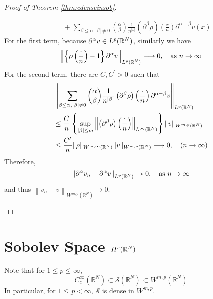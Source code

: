 \begin{proof}[Proof of Theorem \ref{thm:cdenseinsob}]
\begin{enumerate}[label=(\roman*)]
\begin{equation*}
\begin{aligned}
				& \quad+\sum_{\beta \leq \alpha,|\beta| \neq 0}\binom{\alpha}{\beta} \frac{1}{n^{|\beta|}}\left(\partial^\beta \rho\right)\left(\frac{x}{n}\right) \partial^{\alpha-\beta} v(x)
			\end{aligned}
		\end{equation*}
		For the first term, because $\partial^\alpha v \in L^p(\mathbb{R}^N)$, similarly we have
		\begin{equation*}
			\left\|\left\{\rho\left(\frac{\cdot}{n}\right)-1\right\} \partial^\alpha v\right\|_{L^p\left(\mathbb{R}^N\right)} \longrightarrow 0,\quad \text{as } n\rightarrow \infty
		\end{equation*}
		For the second term, there are $C,C^\prime > 0$ such that
		\begin{equation*}
			\begin{aligned}
				& \left\|\sum_{\beta \leq \alpha,|\beta| \neq 0}\binom{\alpha}{\beta} \frac{1}{n^{|\beta|}}\left(\partial^\beta \rho\right)\left(\frac{\cdot}{n}\right) \partial^{\alpha-\beta} v\right\|_{L^p\left(\mathbb{R}^N\right)} \\
				& \leq \frac{C}{n}\left\{\sup_{\left\lvert\beta\right\lvert\leq m}\left\|\left(\partial^\beta \rho\right)\left(\frac{\cdot}{n}\right)\right\|_{L^{\infty}\left(\mathbb{R}^N\right)}\right\}\|v\|_{W^{m, p}\left(\mathbb{R}^N\right)} \\
				& \leq \frac{C^{\prime}}{n}\|\rho\|_{W^{m, \infty}\left(\mathbb{R}^N\right)}\|v\|_{W^{m, p}\left(\mathbb{R}^N\right)} \longrightarrow 0, \quad(n \rightarrow \infty)
			\end{aligned}
		\end{equation*}
		Therefore,
		\begin{equation*}
			\left\|\partial^\alpha v_n-\partial^\alpha v\right\|_{L^p\left(\mathbb{R}^N\right)} \rightarrow 0,\quad \text{as } n\rightarrow \infty
		\end{equation*}
		and thus $\left\|v_n-v\right\|_{W^{m, p}\left(\mathbb{R}^N\right)} \rightarrow 0$.
	\end{enumerate}
\end{proof}

\section{Sobolev Space \texorpdfstring{$H^s(\mathbb{R}^N)$}{Hs}}

Note that for $1 \leq p \leq \infty$,
\begin{equation*}
	C_c^{\infty}\left(\mathbb{R}^N\right) \subset \mathcal{S}\left(\mathbb{R}^N\right) \subset W^{m, p}\left(\mathbb{R}^N\right)
\end{equation*}
In particular, for $1 \leq p < \infty$, $\mathcal{S}$ is dense in $W^{m, p}$. 

